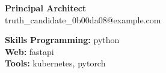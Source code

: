 \documentclass[10pt]{article}
\begin{document}
\begin{center}
    {\LARGE \textbf{Principal Architect}} \\
    truth\_candidate\_0b00da08@example.com
\end{center}

\textbf{Skills}
\textbf{Programming:} python\\
\textbf{Web:} fastapi\\
\textbf{Tools:} kubernetes, pytorch\\
\end{document}
